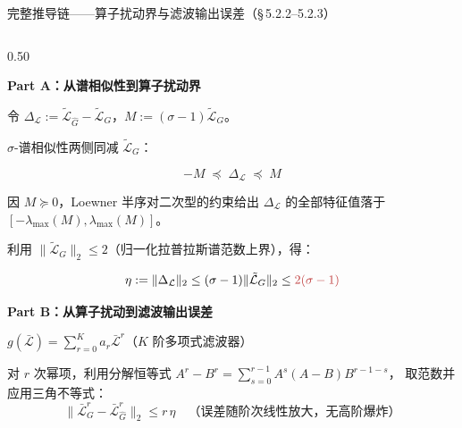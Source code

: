 \documentclass[aspectratio=169,9pt,xcolor=dvipsnames]{beamer}
\newcommand{\blue}[1]{\textcolor{mynavy}{#1}}
\begin{document}
\begin{frame}{完整推导链——算子扰动界与滤波输出误差（§\,5.2.2--5.2.3）}
\begin{columns}[T]

\begin{column}{0.50\textwidth}
  {\small
  \textbf{\blue{Part A：从谱相似性到算子扰动界}}

  令 $\Delta_{\mathcal{L}}:=\tilde{\mathcal{L}}_{\hat{G}}-\tilde{\mathcal{L}}_G$，$M:=(\sigma-1)\tilde{\mathcal{L}}_G$。

  $\sigma$-谱相似性两侧同减 $\tilde{\mathcal{L}}_G$：
  

  \begin{equation*}
    -M\;\preceq\;\Delta_{\mathcal{L}}\;\preceq\; M
  \end{equation*}


  因 $M\succeq 0$，Loewner 半序对二次型的约束给出 $\Delta_{\mathcal{L}}$ 的全部特征值落于 $[-\lambda_{\max}(M),\lambda_{\max}(M)]$。

  利用 $\|\tilde{\mathcal{L}}_G\|_2\le 2$（归一化拉普拉斯谱范数上界），得：
  

  \begin{equation*}
    \eta:=\|\Delta_{\mathcal{L}}\|_2
    \le(\sigma-1)\|\tilde{\mathcal{L}}_G\|_2
    \le{\color{myred}2(\sigma-1)}
  \end{equation*}


  \vspace{0.2cm}
  \textbf{\blue{Part B：从算子扰动到滤波输出误差}}

  $g(\bar{\mathcal{L}})=\sum_{r=0}^{K}a_r\bar{\mathcal{L}}^r$（$K$ 阶多项式滤波器）

  对 $r$ 次幂项，利用分解恒等式
  $A^r-B^r=\sum_{s=0}^{r-1}A^s(A-B)B^{r-1-s}$，
  取范数并应用三角不等式：
  \begin{equation*}
    \|\bar{\mathcal{L}}_G^r-\bar{\mathcal{L}}_{\hat{G}}^r\|_2\le r\,\eta
    \quad\text{（误差随阶次线性放大，无高阶爆炸）}
  \end{equation*}

}
\end{column}
\end{columns}
\end{frame}
\end{document}
